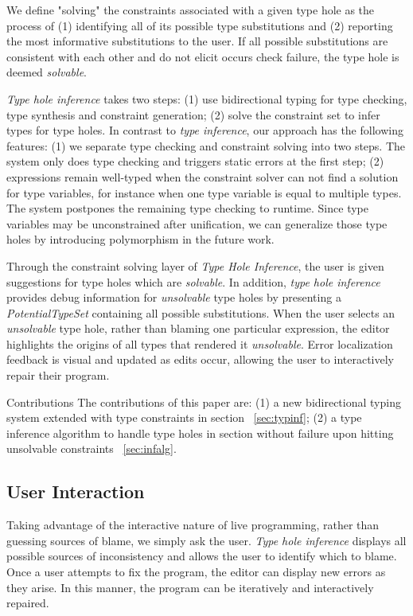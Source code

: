 We define "solving" the constraints associated with a given type hole as the process of (1) identifying all of its possible type substitutions and (2) reporting the most informative substitutions to the user. If all possible substitutions are consistent with each other and do not elicit occurs check failure, the type hole is deemed \emph{solvable}.

\emph{Type hole inference} takes two steps: (1) use bidirectional typing for type checking, type synthesis and constraint generation; (2) solve the constraint set to infer types for type holes. In contrast to \emph{type inference}, our approach has the following features: (1) we separate type checking and constraint solving into two steps. The system only does type checking and triggers static errors at the first step; (2) expressions remain well-typed when the constraint solver can not find a solution for type variables, for instance when one type variable is equal to multiple types. The system postpones the remaining type checking to runtime. Since  type variables may be unconstrained after unification, we can generalize those type holes by introducing polymorphism in the future work. 

Through the constraint solving layer of \emph{Type Hole Inference}, the user is given suggestions for type holes which are \textit{solvable}. In addition, \emph{type hole inference} provides debug information for \emph{unsolvable} type holes by presenting a \emph{PotentialTypeSet} containing all possible substitutions. When the user selects an \emph{unsolvable} type hole, rather than blaming one particular expression, the editor highlights the origins of all types that rendered it \emph{unsolvable}. Error localization feedback is visual and updated as edits occur, allowing the user to interactively repair their program.

\par{Contributions} The contributions of this paper are: (1) a new bidirectional typing system extended with type constraints in section ~\ref{sec:typinf}; (2) a type inference algorithm to handle type holes in section without failure upon hitting unsolvable constraints ~\ref{sec:infalg}.

\subsection{User Interaction}

Taking advantage of the interactive nature of live programming, rather than guessing sources of blame, we simply ask the user. \emph{Type hole inference} displays all possible sources of inconsistency and allows the user to identify which to blame. Once a user attempts to fix the program, the editor can display new errors as they arise. In this manner, the program can be iteratively and interactively repaired. 

